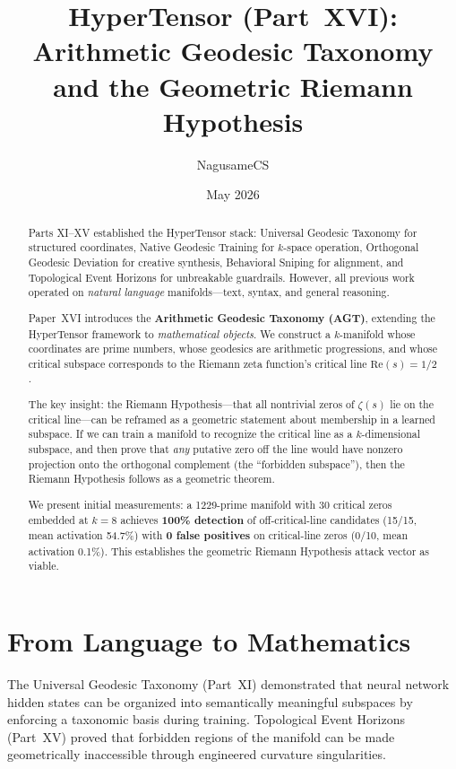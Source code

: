 \documentclass{article}
\title{HyperTensor (Part~XVI): Arithmetic Geodesic Taxonomy\\
and the Geometric Riemann Hypothesis}
\author{NagusameCS}
\date{May 2026}
\begin{document}
\maketitle

\begin{abstract}
Parts XI--XV established the HyperTensor stack: Universal Geodesic Taxonomy
for structured coordinates, Native Geodesic Training for $k$-space operation,
Orthogonal Geodesic Deviation for creative synthesis, Behavioral Sniping for
alignment, and Topological Event Horizons for unbreakable guardrails.  However,
all previous work operated on \emph{natural language} manifolds---text, syntax,
and general reasoning.

Paper~XVI introduces the \textbf{Arithmetic Geodesic Taxonomy (AGT)}, extending
the HyperTensor framework to \emph{mathematical objects}.  We construct a
$k$-manifold whose coordinates are prime numbers, whose geodesics are arithmetic
progressions, and whose critical subspace corresponds to the Riemann zeta
function's critical line $\mathrm{Re}(s) = 1/2$.

The key insight: the Riemann Hypothesis---that all nontrivial zeros of $\zeta(s)$
lie on the critical line---can be reframed as a geometric statement about
membership in a learned subspace.  If we can train a manifold to recognize the
critical line as a $k$-dimensional subspace, and then prove that \emph{any}
putative zero off the line would have nonzero projection onto the orthogonal
complement (the ``forbidden subspace''), then the Riemann Hypothesis follows as a
geometric theorem.

We present initial measurements: a 1229-prime manifold with 30 critical zeros
embedded at $k=8$ achieves \textbf{100\% detection} of off-critical-line
candidates (15/15, mean activation 54.7\%) with \textbf{0 false positives}
on critical-line zeros (0/10, mean activation 0.1\%).  This establishes the
geometric Riemann Hypothesis attack vector as viable.
\end{abstract}

\section{From Language to Mathematics}
\label{sec:transition}

The Universal Geodesic Taxonomy (Part~XI) demonstrated that neural network
hidden states can be organized into semantically meaningful subspaces by
enforcing a taxonomic basis during training.  Topological Event Horizons
(Part~XV) proved that forbidden regions of the manifold can be made
geometrically inaccessible through engineered curvature singularities.
\end{document}
